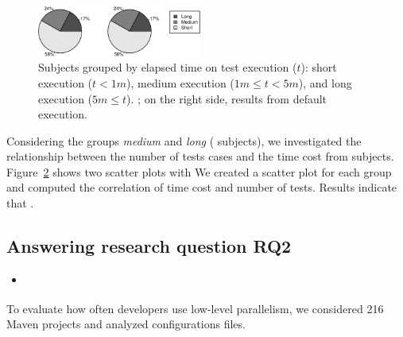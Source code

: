 \begin{figure}[h!]
    \centering
    \includegraphics[width=0.48\textwidth]{results/plots/piechart-timecost.pdf}
    \caption{\label{fig:piechart-time} Subjects grouped by elapsed time on test
    execution ($t$): short execution ($t < 1m$), medium execution ($1m \leq t <
    5m$), and long execution ($5m \leq t$).  ; on the right side, results from default execution.}
\end{figure}

Considering the groups \emph{medium} and \emph{long} (
subjects), we investigated the relationship between the number of
tests cases and the time cost from subjects.  Figure~\ref{fig:scatters}
shows two scatter plots with We created a scatter plot for each group
and computed the correlation of time cost and number of tests.
 Results indicate that
.

\begin{figure}[h!]%
    \centering
    \caption{}%
    \label{fig:scatters}%
\end{figure}

\subsection{Answering research question RQ2}
\label{sec:rqTwo}

\begin{itemize}
    \item \emph{\RQB}
\end{itemize}

To evaluate how often developers use low-level parallelism, we
considered 216 Maven projects and analyzed  configurations
files. 

